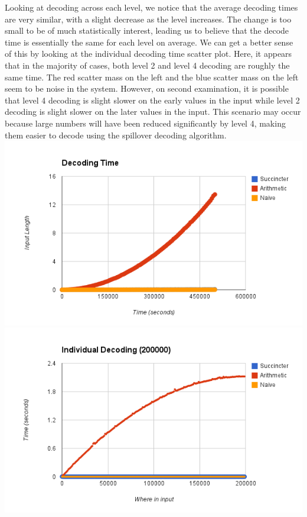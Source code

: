 \documentclass{article}
\begin{document}
Looking at decoding across each level, we notice that the average decoding times are very similar, with a slight decrease as the level increases. The change is too small to be of much statistically interest, leading us to believe that the decode time is essentially the same for each level on average. We can get a better sense of this by looking at the individual decoding time scatter plot. Here, it appears that in the majority of cases, both level 2 and level 4 decoding are roughly the same time. The red scatter mass on the left and the blue scatter mass on the left seem to be noise in the system. However, on second examination, it is possible that level 4 decoding is slight slower on the early values in the input while level 2 decoding is slight slower on the later values in the input. This scenario may occur because large numbers will have been reduced significantly by level 4, making them easier to decode using the spillover decoding algorithm.\\

\includegraphics[scale=0.4]{images/decoding_time}
\includegraphics[scale=0.4]{images/individual_decode_20000}
\afterpage{\vfill}
\end{document}
